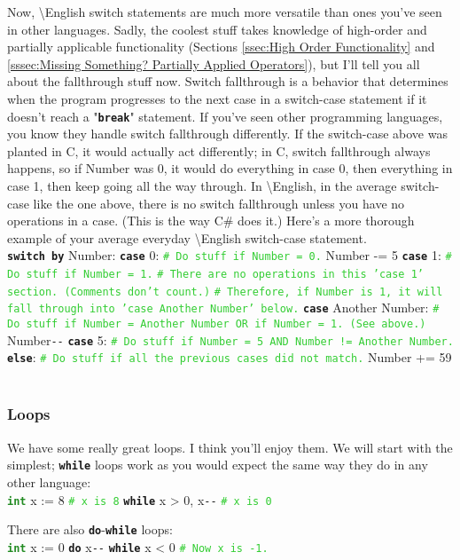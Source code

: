 \documentclass{article}
\newcommand{\English}{\textbackslash{}English}				%
\newcommand{\sssecl}[1]{\subsubsection{#1}\label{sssec:#1}}
\newcommand{\codecomment}[1]{\texttt{\textcolor{LimeGreen}{#1}}}
\newcommand{\commentline}[1]{\codecomment{\# #1}}
\newcommand{\type}[1]{\texttt{\textcolor{ForestGreen}{\textbf{#1}}}}
\newcommand{\common}[1]{\texttt{\textcolor{Mulberry}{\textbf{#1}}}}
\newenvironment{code}[0]
{\ttfamily{}				%
\setlength\parindent{0cm}	%
~\\}
{\setlength\parindent{1cm}
~\\}
\begin{document}
\indent Now, \English{} switch statements are much more versatile than ones you've seen in other languages. Sadly, the coolest stuff takes knowledge of high-order and partially applicable functionality (Sections \ref{ssec:High Order Functionality} and \ref{sssec:Missing Something? Partially Applied Operators}), but I'll tell you all about the fallthrough stuff now.
\indent Switch fallthrough is a behavior that determines when the program progresses to the next case in a switch-case statement if it doesn't reach a "\common{break}" statement. If you've seen other programming languages, you know they handle switch fallthrough differently. If the switch-case above was planted in C, it would actually act differently; in C, switch fallthrough always happens, so if Number was 0, it would do everything in case 0, then everything in case 1, then keep going all the way through. In \English{}, in the average switch-case like the one above, there is no switch fallthrough unless you have no operations in a case. (This is the way C\# does it.) Here's a more thorough example of your average everyday \English{} switch-case statement.
\begin{code}
\common{switch by} Number:
\common{case} 0:
\qquad\commentline{Do stuff if Number = 0.}
\qquad{}Number -= 5
\common{case} 1:
\qquad\commentline{Do stuff if Number = 1.}
\qquad\commentline{There are no operations in this 'case 1' section. (Comments don't count.)}
\qquad\commentline{Therefore, if Number is 1, it will fall through into 'case Another Number' below.}
\common{case} Another Number:
\qquad\commentline{Do stuff if Number = Another Number OR if Number = 1. (See above.)}
\qquad{}Number\verb+--+
\common{case} 5:
\qquad\commentline{Do stuff if Number = 5 AND Number != Another Number.}
\common{else}:
\qquad\commentline{Do stuff if all the previous cases did not match.}
\qquad{}Number += 59
\end{code}
\sssecl{Loops}
\indent We have some really great loops. I think you'll enjoy them.
\indent We will start with the simplest; \common{while} loops work as you would expect the same way they do in any other language:
\begin{code}
\type{int} x := 8 \commentline{x is 8}
\common{while} x > 0,
\qquad{}x\verb+--+
\commentline{x is 0}
\end{code}

\indent There are also \common{do}-\common{while} loops:
\begin{code}
\type{int} x := 0
\common{do}
\qquad{}x\verb+--+
\common{while} x < 0
\commentline{Now x is -1.}
\end{code}
\end{document}
